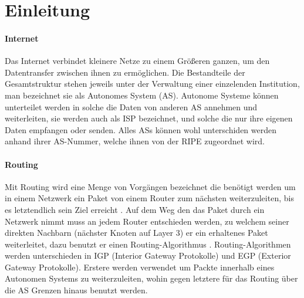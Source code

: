 \section{Einleitung}

\paragraph{Internet}
Das Internet verbindet kleinere Netze zu einem Größeren ganzen, um den Datentransfer zwischen ihnen zu ermöglichen. Die Bestandteile der Gesamtstruktur stehen jeweils unter der Verwaltung einer einzelenden Institution, man bezeichnet sie als Autonomes System (AS). Autonome Systeme können unterteilet werden in solche die Daten von anderen AS annehmen und weiterleiten, sie werden auch als ISP bezeichnet, und solche die nur ihre eigenen Daten empfangen oder senden. Alles ASs können wohl unterschiden werden anhand ihrer AS-Nummer, welche ihnen von der RIPE zugeordnet wird.

\paragraph{Routing}
Mit Routing wird eine Menge von Vorgängen bezeichnet die benötigt werden um in einem Netzwerk ein Paket von einem Router zum nächsten weiterzuleiten, bis es letztendlich sein Ziel erreicht \cite{Mahorta:2002:IR}. Auf dem Weg den das Paket durch ein Netzwerk nimmt muss an jedem Router entschieden werden, zu welchem seiner direkten Nachbarn (nächster Knoten auf Layer 3) er ein erhaltenes Paket weiterleitet, dazu benutzt er einen Routing-Algorithmus \cite{Tanenbaum:2003:CN}. Routing-Algorithmen werden unterschieden in IGP (Interior Gateway Protokolle) und EGP (Exterior Gateway Protokolle). Erstere werden verwendet um Packte innerhalb eines Autonomen Systems zu weiterzuleiten, wohin gegen letztere für das Routing über die AS Grenzen hinaus benutzt werden.


